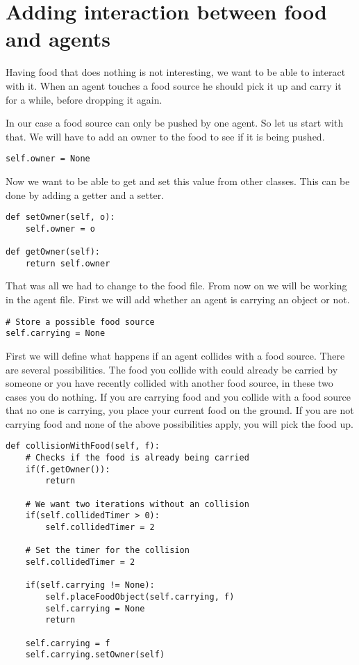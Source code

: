 \section{Adding interaction between food and agents}
Having food that does nothing is not interesting, we want to be able to interact with it. When an agent touches a food source he should pick it up and carry it for a while, before dropping it again.

In our case a food source can only be pushed by one agent. So let us start with that. We will have to add an owner to the food to see if it is being pushed.

\begin{lstlisting}
self.owner = None
\end{lstlisting}

Now we want to be able to get and set this value from other classes. This can be done by adding a getter and a setter.
\begin{lstlisting}
def setOwner(self, o):
    self.owner = o

def getOwner(self):
    return self.owner
\end{lstlisting}
That was all we had to change to the food file. From now on we will be working in the agent file. First we will add whether an agent is carrying an object or not.
\begin{lstlisting}
# Store a possible food source
self.carrying = None
\end{lstlisting}

First we will define what happens if an agent collides with a food source. There are several possibilities. The food you collide with could already be carried by someone or you have recently collided with another food source, in these two cases you do nothing. If you are carrying food and you collide with a food source that no one is carrying, you place your current food on the ground. If you are not carrying food and none of the above possibilities apply, you will pick the food up.
\begin{lstlisting}
def collisionWithFood(self, f):
    # Checks if the food is already being carried
    if(f.getOwner()):
        return

    # We want two iterations without an collision
    if(self.collidedTimer > 0):
        self.collidedTimer = 2

    # Set the timer for the collision
    self.collidedTimer = 2

    if(self.carrying != None):
        self.placeFoodObject(self.carrying, f)
        self.carrying = None
        return

    self.carrying = f
    self.carrying.setOwner(self)
\end{lstlisting}


